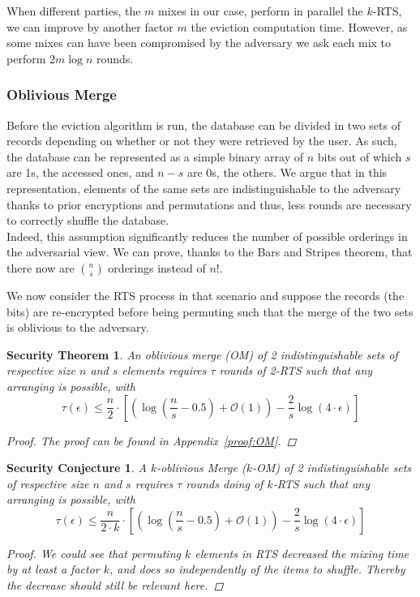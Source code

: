 \documentclass[USenglish,oneside,twocolumn]{article}
\newtheorem{secthm}{Security Theorem}
\newtheorem{seccjt}{Security Conjecture}
\begin{document}
When different parties, the $m$ mixes in our case, perform in parallel the $k$-RTS, we can improve by another factor $m$ the eviction computation time. However, as some mixes can have been compromised by the adversary we ask each mix to perform $2 m\log n$ rounds.
%
\subsubsection{Oblivious Merge}\label{OM}
Before the eviction algorithm is run, the database can be divided in two sets of records depending on whether or not they were retrieved by the user. As such, the database can be represented as a simple binary array of $n$ bits out of which $s$ are 1s, the accessed ones, and $n-s$ are 0s, the others.
We argue that in this representation, elements of the same sets are indistinguishable to the adversary thanks to prior encryptions and permutations and thus, less rounds are necessary to correctly shuffle the database.\\

Indeed, this assumption significantly reduces the number of possible orderings in the adversarial view. We can prove, thanks to the Bars and Stripes theorem, that there now are ${n \choose s}$ orderings instead of $n!$.

We now consider the RTS process in that scenario and suppose the records (the bits) are re-encrypted before being permuting such that the merge of the two sets is oblivious to the adversary.

\begin{secthm}
An oblivious merge (OM) of 2 indistinguishable sets of respective size $n$ and $s$ elements requires $\tau$ rounds of 2-RTS such that any arranging is possible, with
$$\tau(\epsilon) \leq \frac{n}{2}  \cdot \left [ \left( \log \left (\frac{n}{s}-0.5\right) +\mathcal{O}\left(1\right) \right ) - \frac{2}{s} \log \left( 4 \cdot \epsilon\right) \right ] $$%
\begin{proof}
The proof can be found in Appendix~\ref{proof:OM}.
\end{proof}
\end{secthm}

\begin{seccjt}\label{sec:kOM}
A $k$-oblivious Merge ($k$-OM) of 2 indistinguishable sets of respective size $n$ and $s$ requires $\tau$ rounds doing of $k$-RTS such that any arranging is possible, with
$$ \tau(\epsilon) \leq \frac{n}{2\cdot k}  \cdot \left [ \left( \log \left (\frac{n}{s}-0.5\right) +\mathcal{O}\left(1\right) \right ) - \frac{2}{s} \log \left( 4 \cdot \epsilon\right) \right ] $$
\begin{proof}
We could see that permuting $k$ elements in RTS decreased the mixing time by at least a factor $k$, and does so independently of the items to shuffle. Thereby the decrease should still be relevant here.
\end{proof}
\end{seccjt}
%
\end{document}
